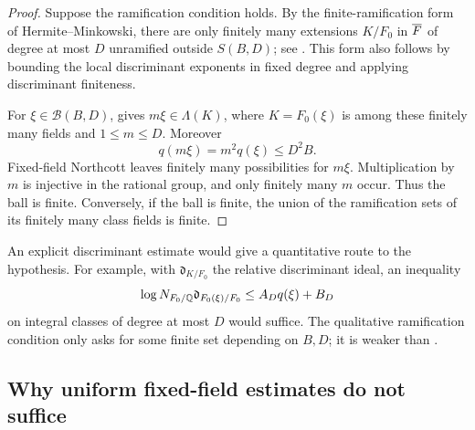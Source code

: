 
\begin{proof}
Suppose the ramification condition holds. By the finite-ramification
form of Hermite--Minkowski, there are only finitely many extensions
\(K/F_0\) in \(\overline F\) of degree at most \(D\) unramified
 outside \(S(B,D)\); see \cite[Theorem~10.2.2]{Kedlaya}.
This form also follows by bounding the local discriminant exponents
in fixed degree and applying discriminant finiteness.

For \(\xi\in\mathcal B(B,D)\),  gives
\(m\xi\in\Lambda(K)\), where \(K=F_0(\xi)\) is among these
finitely many fields and \(1\le m\le D\). Moreover
\[
 q(m\xi)=m^2q(\xi)\le D^2B.
\]
Fixed-field Northcott leaves finitely many possibilities for
\(m\xi\). Multiplication by \(m\) is injective in the rational
group, and only finitely many \(m\) occur. Thus the ball is finite.
Conversely, if the ball is finite, the union of the ramification
sets of its finitely many class fields is finite.
\end{proof}

An explicit discriminant estimate would give a quantitative route
to the hypothesis. For example, with \(\mathfrak d_{K/F_0}\)
the relative discriminant ideal, an inequality
\begin{equation}\label{eq:discriminant-target}
 \log N_{F_0/\mathbb Q}\mathfrak d_{F_0(\xi)/F_0}
       \le A_D q(\xi)+B_D
\end{equation}
on integral classes of degree at most \(D\) would suffice.
The qualitative ramification condition only asks for some finite
set depending on \(B,D\); it is weaker than
.

\subsection{Why uniform fixed-field estimates do not suffice}
\label{sec:quadratic-example}

